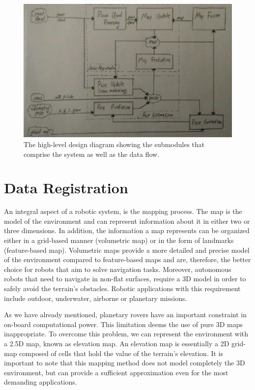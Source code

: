 \begin{figure}[th]
    \centering
    \includegraphics[scale=0.4]{Figures/high_level_design_diagram}
    \decoRule
    \caption[High Level Design Diagram]{
        The high-level design diagram showing the submodules that comprise
        the system as well as the data flow.}
    \label{fig:HLD}
\end{figure}

\section{Data Registration}

An integral aspect of a robotic system, is the mapping process.
The map is the model of the environment and can represent information about
it in either two or three dimensions.
In addition, the information a map represents can be organized either in
a grid-based manner (volumetric map) or in the form of landmarks
(feature-based map).
Volumetric maps provide a more detailed and precise model of the environment
compared to feature-based maps and are, therefore, the better choice for
robots that aim to solve navigation tasks.
Moreover, autonomous robots that need to navigate in non-flat surfaces,
require a 3D model in order to safely avoid the terrain's obstacles.
Robotic applications with this requirement include outdoor, underwater,
airborne or planetary missions.


As we have already mentioned, planetary rovers have an important constraint
in on-board computational power.
This limitation deems the use of pure 3D maps inappropriate.
To overcome this problem, we can represent the environment with a 2.5D map,
known as elevation map.
An elevation map is essentially a 2D grid-map composed of cells that hold
the value of the terrain's elevation.
It is important to note that this mapping method does not model completely
the 3D environment, but can provide a sufficient approximation even for
the most demanding applications.

